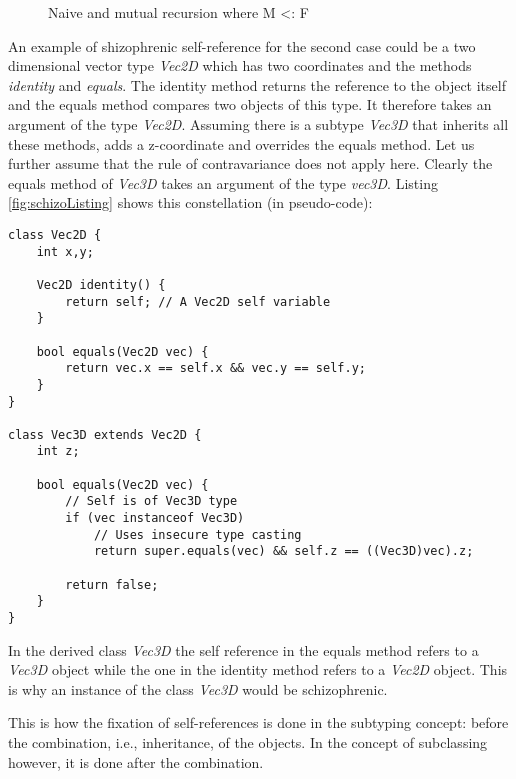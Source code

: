 \begin{figure}
	\centering
	\caption{Naive and mutual recursion where M <: F}
	\label{fig:schizoRecursion}
\end{figure}

An example of shizophrenic self-reference for the second case could be
a two dimensional vector type \emph{Vec2D} which has two coordinates
and the methods \emph{identity} and \emph{equals}. The identity method
returns the reference to the object itself and the equals method
compares two objects of this type. It therefore takes an argument
of the type \emph{Vec2D}. Assuming there is a subtype \emph{Vec3D}
that inherits all these methods, adds a z-coordinate and overrides the
equals method. Let us further assume that the rule of contravariance
does not apply here. Clearly the equals method of \emph{Vec3D} takes
an argument of the type \emph{vec3D}. Listing \ref{fig:schizoListing}
shows this constellation (in pseudo-code):

\begin{lstlisting}[float,caption={An example of schizophrenic self-reference},label={fig:schizoListing}]
class Vec2D {
	int x,y;

	Vec2D identity() {
		return self; // A Vec2D self variable
	}

	bool equals(Vec2D vec) {
		return vec.x == self.x && vec.y == self.y;
	}
}

class Vec3D extends Vec2D {
	int z;

	bool equals(Vec2D vec) {
		// Self is of Vec3D type
		if (vec instanceof Vec3D)
			// Uses insecure type casting
			return super.equals(vec) && self.z == ((Vec3D)vec).z;

		return false;
	}
}
\end{lstlisting}

In the derived class \emph{Vec3D} the self reference in the equals 
method refers to a \emph{Vec3D} object while the one in the identity method
refers to a \emph{Vec2D} object. This is why an instance of the class
\emph{Vec3D} would be schizophrenic.

This is how the fixation of self-references is done in the subtyping
concept: before the combination, i.e., inheritance, of the objects. In the
concept of subclassing however, it is done after the combination.

